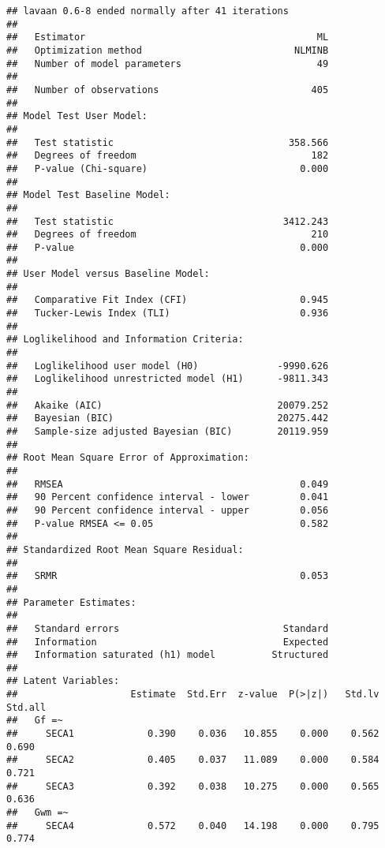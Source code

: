 \documentclass[
]{article}
\begin{document}
\begin{verbatim}
## lavaan 0.6-8 ended normally after 41 iterations
## 
##   Estimator                                         ML
##   Optimization method                           NLMINB
##   Number of model parameters                        49
##                                                       
##   Number of observations                           405
##                                                       
## Model Test User Model:
##                                                       
##   Test statistic                               358.566
##   Degrees of freedom                               182
##   P-value (Chi-square)                           0.000
## 
## Model Test Baseline Model:
## 
##   Test statistic                              3412.243
##   Degrees of freedom                               210
##   P-value                                        0.000
## 
## User Model versus Baseline Model:
## 
##   Comparative Fit Index (CFI)                    0.945
##   Tucker-Lewis Index (TLI)                       0.936
## 
## Loglikelihood and Information Criteria:
## 
##   Loglikelihood user model (H0)              -9990.626
##   Loglikelihood unrestricted model (H1)      -9811.343
##                                                       
##   Akaike (AIC)                               20079.252
##   Bayesian (BIC)                             20275.442
##   Sample-size adjusted Bayesian (BIC)        20119.959
## 
## Root Mean Square Error of Approximation:
## 
##   RMSEA                                          0.049
##   90 Percent confidence interval - lower         0.041
##   90 Percent confidence interval - upper         0.056
##   P-value RMSEA <= 0.05                          0.582
## 
## Standardized Root Mean Square Residual:
## 
##   SRMR                                           0.053
## 
## Parameter Estimates:
## 
##   Standard errors                             Standard
##   Information                                 Expected
##   Information saturated (h1) model          Structured
## 
## Latent Variables:
##                    Estimate  Std.Err  z-value  P(>|z|)   Std.lv  Std.all
##   Gf =~                                                                 
##     SECA1             0.390    0.036   10.855    0.000    0.562    0.690
##     SECA2             0.405    0.037   11.089    0.000    0.584    0.721
##     SECA3             0.392    0.038   10.275    0.000    0.565    0.636
##   Gwm =~                                                                
##     SECA4             0.572    0.040   14.198    0.000    0.795    0.774

\end{verbatim}
\end{document}
